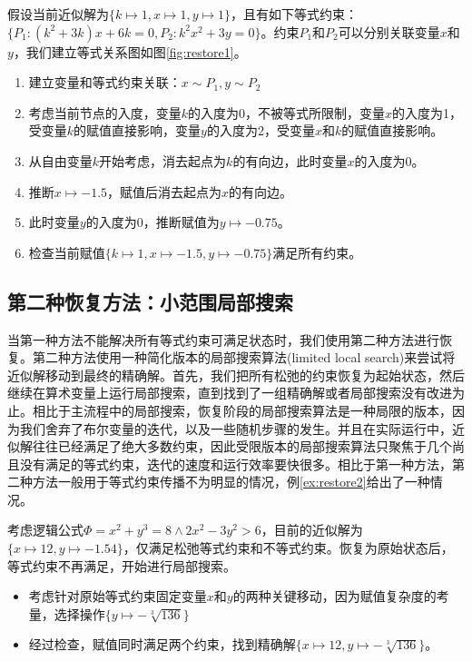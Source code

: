 \begin{example}
\label{ex:restore1}
假设当前近似解为$\{k \mapsto 1, x \mapsto 1, y \mapsto 1\}$，且有如下等式约束：$\{P_1: (k^2 + 3k) x + 6k = 0, P_2: k^2 x^2 + 3y = 0\}$。约束$P_1$和$P_2$可以分别关联变量$x$和$y$，我们建立等式关系图如图\ref{fig:restore1}。
\begin{enumerate}
    \item 建立变量和等式约束关联：$x \sim P_1, y \sim P_2$
    \item 考虑当前节点的入度，变量$k$的入度为0，不被等式所限制，变量$x$的入度为1，受变量$k$的赋值直接影响，变量$y$的入度为2，受变量$x$和$k$的赋值直接影响。
    \item 从自由变量$k$开始考虑，消去起点为$k$的有向边，此时变量$x$的入度为0。
    \item 推断$x \mapsto -1.5$，赋值后消去起点为$x$的有向边。
    \item 此时变量$y$的入度为0，推断赋值为$y \mapsto -0.75$。
    \item 检查当前赋值$\{k \mapsto 1, x \mapsto -1.5, y \mapsto -0.75\}$满足所有约束。
\end{enumerate}
\end{example}


\subsection{第二种恢复方法：小范围局部搜索}
当第一种方法不能解决所有等式约束可满足状态时，我们使用第二种方法进行恢复。第二种方法使用一种简化版本的局部搜索算法(limited local search)来尝试将近似解移动到最终的精确解。首先，我们把所有松弛的约束恢复为起始状态，然后继续在算术变量上运行局部搜索，直到找到了一组精确解或者局部搜索没有改进为止。相比于主流程中的局部搜索，恢复阶段的局部搜索算法是一种局限的版本，因为我们舍弃了布尔变量的迭代，以及一些随机步骤的发生。并且在实际运行中，近似解往往已经满足了绝大多数约束，因此受限版本的局部搜索算法只聚焦于几个尚且没有满足的等式约束，迭代的速度和运行效率要快很多。相比于第一种方法，第二种方法一般用于等式约束传播不为明显的情况，例\ref{ex:restore2}给出了一种情况。

\begin{example}
考虑逻辑公式$\Phi = x^2 + y^3 = 8 \wedge 2x^2 - 3y^2 > 6$，目前的近似解为$\{x \mapsto 12, y \mapsto -1.54\}$，仅满足松弛等式约束和不等式约束。恢复为原始状态后，等式约束不再满足，开始进行局部搜索。
\begin{itemize}
    \item 考虑针对原始等式约束固定变量$x$和$y$的两种关键移动，因为赋值复杂度的考量，选择操作$\{y \mapsto -\sqrt[3]{136}\}$
    \item 经过检查，赋值同时满足两个约束，找到精确解$\{x \mapsto 12, y \mapsto -\sqrt[3]{136}\}$。
\end{itemize}
\label{ex:restore2}
\end{example}

